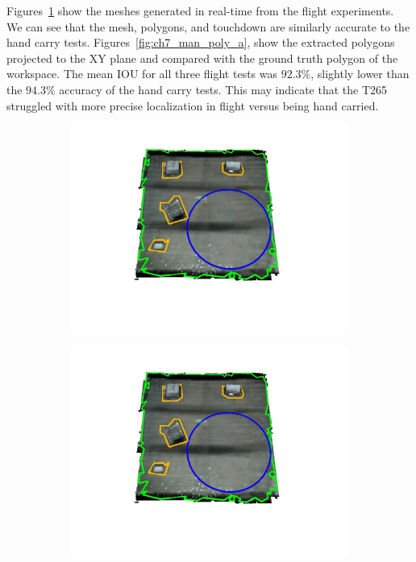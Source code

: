 Figures~\ref{fig:ch7_flight_mesh_a} show the meshes generated in real-time from the flight experiments. We can see that the mesh, polygons, and touchdown are similarly accurate to the hand carry tests. Figures~\ref{fig:ch7_man_poly_a}, show the extracted polygons projected to the XY plane and compared with the ground truth polygon of the workspace. The mean \ac{IOU} for all three flight tests was $92.3\%$, slightly lower than the $94.3$\% accuracy of the hand carry tests.  This may indicate that the T265 struggled with more precise localization in flight versus being hand carried. 


\begin{figure}[!htb]
  \centering
  \begin{subfigure}[t]{.30\linewidth}
    \centering  \includegraphics[page=1,clip,trim=4cm 3cm 4cm 1.4cm,width=.99\linewidth]{chapter_7_experiments/imgs/mesh_flight.pdf}
    \caption{\label{fig:ch7_flight_mesh_a}}
  \end{subfigure}
  \begin{subfigure}[t]{.30\linewidth}
    \centering  \includegraphics[page=2,clip,trim=4cm 3cm 4cm 1.4cm,width=.99\linewidth]{chapter_7_experiments/imgs/mesh_flight.pdf}
    \caption{\label{fig:ch7_flight_mesh_b}}
  \end{subfigure}
  

\end{figure}

